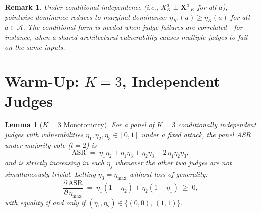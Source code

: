 \documentclass[11pt]{article}
\newtheorem{lemma}[theorem]{Lemma}
\newtheorem*{remark}{Remark}
\begin{document}
\begin{remark}
Under conditional independence (i.e., $X_K^a \perp \mathbf{X}_{-K}^a$ for all $a$), pointwise dominance reduces to \emph{marginal dominance}: $\eta_{K'}(a) \geq \eta_K(a)$ for all $a \in \mathcal{A}$. The conditional form is needed when judge failures are correlated---for instance, when a shared architectural vulnerability causes multiple judges to fail on the same inputs.
\end{remark}


\section{Warm-Up: $K=3$, Independent Judges}

\begin{lemma}[$K=3$ Monotonicity]\label{lem:k3}
For a panel of $K=3$ conditionally independent judges with vulnerabilities $\eta_1, \eta_2, \eta_3 \in [0,1]$ under a fixed attack, the panel ASR under majority vote ($t=2$) is
\[
    \mathrm{ASR} \;=\; \eta_1\eta_2 + \eta_1\eta_3 + \eta_2\eta_3 - 2\,\eta_1\eta_2\eta_3,
\]
and is strictly increasing in each $\eta_j$ whenever the other two judges are not simultaneously trivial. Letting $\eta_3 = \eta_{\max}$ without loss of generality:
\[
    \frac{\partial\,\mathrm{ASR}}{\partial\,\eta_{\max}} \;=\; \eta_1(1-\eta_2) + \eta_2(1-\eta_1) \;\geq\; 0,
\]
with equality if and only if $(\eta_1, \eta_2) \in \{(0,0),\, (1,1)\}$.
\end{lemma}
\end{document}
